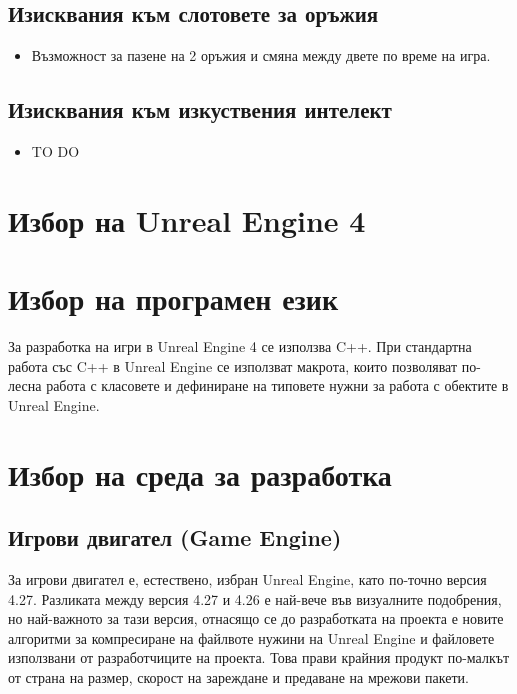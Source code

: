 \documentclass[14pt]{extreport}
\begin{document}
\subsection{Изисквания към слотовете за оръжия}
\begin{itemize}
	\item Възможност за пазене на 2 оръжия и смяна между двете по време на игра.
\end{itemize}

\subsection{Изисквания към изкуствения интелект}
\begin{itemize}
	\item TO DO
\end{itemize}

\section{Избор на Unreal Engine 4}

\section{Избор на програмен език}

За разработка на игри в Unreal Engine 4 се използва C++. При стандартна работа със C++ в Unreal Engine се използват макрота, които позволяват по-лесна работа с класовете и дефиниране на типовете нужни за работа с обектите в Unreal Engine. 

\section{Избор на среда за разработка}

\subsection{Игрови двигател (Game Engine)}

За игрови двигател е, естествено, избран Unreal Engine, като по-точно версия 4.27. Разликата между версия 4.27 и 4.26 е най-вече във визуалните подобрения, но най-важното за тази версия, отнасящо се до разработката на проекта е новите алгоритми за компресиране на файлвоте нужини на Unreal Engine и файловете използвани от разработчиците на проекта. Това прави крайния продукт по-малкът от страна на размер, скорост на зареждане и предаване на мрежови пакети. 
\end{document}
